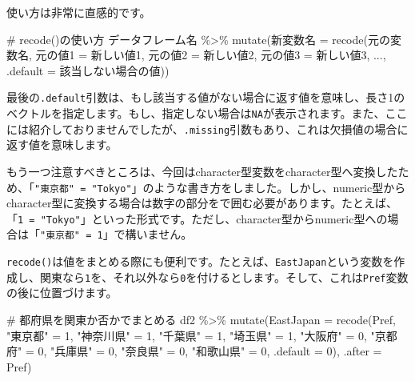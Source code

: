 \documentclass[
  a4paper,
  pandoc,
  ja=standard,
  jafont=haranoaji]{bxjsbook}
\newenvironment{Shaded}{\begin{snugshade}}{\end{snugshade}}
\newcommand{\AttributeTok}[1]{\textcolor[rgb]{0.00,0.48,0.65}{#1}}
\newcommand{\CommentTok}[1]{\textcolor[rgb]{0.37,0.37,0.37}{#1}}
\newcommand{\DecValTok}[1]{\textcolor[rgb]{0.68,0.00,0.00}{#1}}
\newcommand{\FunctionTok}[1]{\textcolor[rgb]{0.28,0.35,0.67}{#1}}
\newcommand{\NormalTok}[1]{\textcolor[rgb]{0.00,0.48,0.65}{#1}}
\newcommand{\OtherTok}[1]{\textcolor[rgb]{0.00,0.48,0.65}{#1}}
\newcommand{\SpecialCharTok}[1]{\textcolor[rgb]{0.37,0.37,0.37}{#1}}
\newcommand{\StringTok}[1]{\textcolor[rgb]{0.13,0.47,0.30}{#1}}
\begin{document}
使い方は非常に直感的です。

\begin{Shaded}
\begin{Highlighting}[numbers=left,,]
\CommentTok{\# recode()の使い方}
\NormalTok{データフレーム名 }\SpecialCharTok{\%\textgreater{}\%}
  \FunctionTok{mutate}\NormalTok{(新変数名 }\OtherTok{=} \FunctionTok{recode}\NormalTok{(元の変数名,}
\NormalTok{                            元の値1 }\OtherTok{=}\NormalTok{  新しい値1, }
\NormalTok{                            元の値2 }\OtherTok{=}\NormalTok{  新しい値2, }
\NormalTok{                            元の値3 }\OtherTok{=}\NormalTok{  新しい値3, }
\NormalTok{                            ...,}
                            \AttributeTok{.default =}\NormalTok{ 該当しない場合の値))}
\end{Highlighting}
\end{Shaded}

最後の\texttt{.default}引数は、もし該当する値がない場合に返す値を意味し、長さ1のベクトルを指定します。もし、指定しない場合は\texttt{NA}が表示されます。また、ここには紹介しておりませんでしたが、\texttt{.missing}引数もあり、これは欠損値の場合に返す値を意味します。

もう一つ注意すべきところは、今回はcharacter型変数をcharacter型へ変換したため、「\texttt{"東京都"\ =\ "Tokyo"}」のような書き方をしました。しかし、numeric型からcharacter型に変換する場合は数字の部分を\texttt{\textasciigrave{}}で囲む必要があります。たとえば、「\texttt{\textasciigrave{}1\textasciigrave{}\ =\ "Tokyo"}」といった形式です。ただし、character型からnumeric型への場合は「\texttt{"東京都"\ =\ 1}」で構いません。

\texttt{recode()}は値をまとめる際にも便利です。たとえば、\texttt{EastJapan}という変数を作成し、関東なら\texttt{1}を、それ以外なら\texttt{0}を付けるとします。そして、これは\texttt{Pref}変数の後に位置づけます。

\begin{Shaded}
\begin{Highlighting}[numbers=left,,]
\CommentTok{\# 都府県を関東か否かでまとめる}
\NormalTok{df2 }\SpecialCharTok{\%\textgreater{}\%} 
  \FunctionTok{mutate}\NormalTok{(}\AttributeTok{EastJapan =} \FunctionTok{recode}\NormalTok{(Pref,}
                            \StringTok{"東京都"}   \OtherTok{=} \DecValTok{1}\NormalTok{,}
                            \StringTok{"神奈川県"} \OtherTok{=} \DecValTok{1}\NormalTok{,}
                            \StringTok{"千葉県"}   \OtherTok{=} \DecValTok{1}\NormalTok{,}
                            \StringTok{"埼玉県"}   \OtherTok{=} \DecValTok{1}\NormalTok{,}
                            \StringTok{"大阪府"}   \OtherTok{=} \DecValTok{0}\NormalTok{,}
                            \StringTok{"京都府"}   \OtherTok{=} \DecValTok{0}\NormalTok{,}
                            \StringTok{"兵庫県"}   \OtherTok{=} \DecValTok{0}\NormalTok{,}
                            \StringTok{"奈良県"}   \OtherTok{=} \DecValTok{0}\NormalTok{,}
                            \StringTok{"和歌山県"} \OtherTok{=} \DecValTok{0}\NormalTok{,}
                            \AttributeTok{.default  =} \DecValTok{0}\NormalTok{),}
         \AttributeTok{.after =}\NormalTok{ Pref)}
\end{Highlighting}
\end{Shaded}
\end{document}
